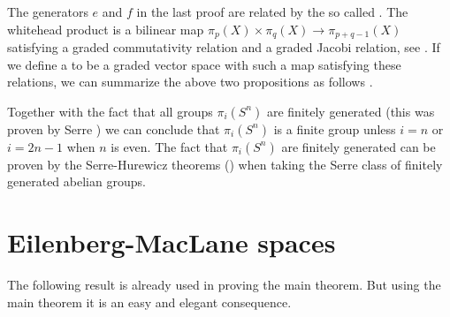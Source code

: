 The generators $e$ and $f$ in the last proof are related by the so called . The whitehead product is a bilinear map $\pi_p(X) \times \pi_q(X) \to \pi_{p+q-1}(X)$ satisfying a graded commutativity relation and a graded Jacobi relation, see \cite{felix}. If we define a  to be a graded vector space with such a map satisfying these relations, we can summarize the above two propositions as follows \cite{berglund}.


Together with the fact that all groups $\pi_i(S^n)$ are finitely generated (this was proven by Serre \cite{serre}) we can conclude that $\pi_i(S^n)$ is a finite group unless $i=n$ or $i=2n-1$ when $n$ is even. The fact that $\pi_i(S^n)$ are finitely generated can be proven by the Serre-Hurewicz theorems () when taking the Serre class of finitely generated abelian groups.


\section{Eilenberg-MacLane spaces}

The following result is already used in proving the main theorem. But using the main theorem it is an easy and elegant consequence.



